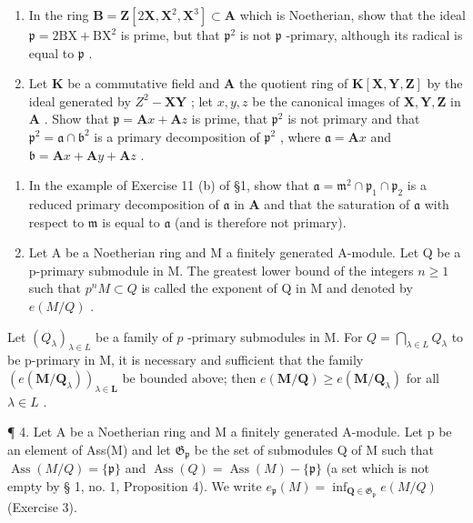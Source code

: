 \begin{enumerate}
\def\labelenumi{(\alph{enumi})}
\setcounter{enumi}{1}
\item
  In the ring \(\mathbf{B} = \mathbf{Z}[2\mathbf{X},\mathbf{X}^2,\mathbf{X}^3] \subset \mathbf{A}\) which is Noetherian, show that the ideal \(\mathfrak{p} = 2\mathrm{BX} + \mathrm{BX}^2\) is prime, but that \(\mathfrak{p}^2\) is not \(\mathfrak{p}\) -primary, although its radical is equal to \(\mathfrak{p}\) .
\item
  Let \(\mathbf{K}\) be a commutative field and \(\mathbf{A}\) the quotient ring of \(\mathbf{K}[\mathbf{X},\mathbf{Y},\mathbf{Z}]\) by the ideal generated by \(Z^2 -\mathbf{XY}\) ; let \(x,y,z\) be the canonical images of \(\mathbf{X},\mathbf{Y},\mathbf{Z}\) in \(\mathbf{A}\) . Show that \(\mathfrak{p} = \mathbf{A}x + \mathbf{A}z\) is prime, that \(\mathfrak{p}^2\) is not primary and that \(\mathfrak{p}^2 = \mathfrak{a}\cap \mathfrak{b}^2\) is a primary decomposition of \(\mathfrak{p}^2\) , where \(\mathfrak{a} = \mathbf{A}x\) and \(\mathfrak{b} = \mathbf{A}x + \mathbf{A}y + \mathbf{A}z\) .
\end{enumerate}

\begin{enumerate}
\def\labelenumi{\arabic{enumi}.}
\setcounter{enumi}{1}
\item
  In the example of Exercise 11 (b) of §1, show that \(\mathfrak{a} = \mathfrak{m}^2 \cap \mathfrak{p}_1 \cap \mathfrak{p}_2\) is a reduced primary decomposition of \(\mathfrak{a}\) in \(\mathbf{A}\) and that the saturation of \(\mathfrak{a}\) with respect to \(\mathfrak{m}\) is equal to \(\mathfrak{a}\) (and is therefore not primary).
\item
  Let A be a Noetherian ring and M a finitely generated A-module. Let Q be a p-primary submodule in M. The greatest lower bound of the integers \(n \geqslant 1\) such that \(p^{n}M \subset Q\) is called the exponent of Q in M and denoted by \(e(M/Q)\) .
\end{enumerate}

Let \((Q_{\lambda})_{\lambda \in L}\) be a family of \(p\) -primary submodules in M. For \(Q = \bigcap_{\lambda \in L} Q_{\lambda}\) to be p-primary in M, it is necessary and sufficient that the family \((e(\mathbf{M}/\mathbf{Q}_{\lambda}))_{\lambda\in\mathbf{L}}\) be bounded above; then \(e(\mathbf{M}/\mathbf{Q})\geqslant e(\mathbf{M}/\mathbf{Q}_{\lambda})\) for all \(\lambda\in L\) .

¶ 4. Let A be a Noetherian ring and M a finitely generated A-module. Let p be an element of Ass(M) and let \(\mathfrak{G}_{\mathfrak{p}}\) be the set of submodules Q of M such that \(\operatorname{Ass}(M/Q) = \{\mathfrak{p}\}\) and \(\operatorname{Ass}(Q) = \operatorname{Ass}(M) - \{\mathfrak{p}\}\) (a set which is not empty by § 1, no. 1, Proposition 4). We write \(e_{\mathfrak{p}}(M) = \inf_{\mathbf{Q} \in \mathfrak{G}_{\mathfrak{p}}} e(M/Q)\) (Exercise 3).

